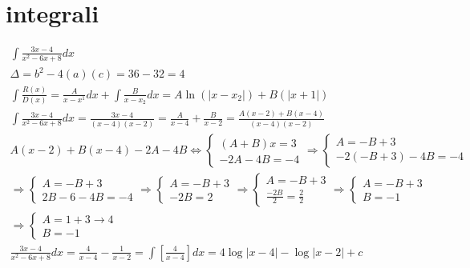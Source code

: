 \documentclass{article}
\newcommand{\abs}[1]{\lvert#1\rvert}
\begin{document}
\section{integrali}
\begin{equation*}
	\begin{matrix}
		\int\frac{3x-4}{x^2-6x+8}dx\\
		\Delta=b^2-4(a)(c)=36-32=4\\
		\int\frac{R(x)}{D(x)}=\frac{A}{x-x^1}dx+\int\frac{B}{x-x_2}dx=A\ln(\abs{x-x_2})+B(\abs{x+1})\\
		\int\frac{3x-4}{x^2-6x+8}dx=\frac{3x-4}{(x-4)(x-2)}=\frac{A}{x-4}+\frac{B}{x-2}=\frac{A(x-2)+B(x-4)}{(x-4)(x-2)}\\
		A(x-2)+B(x-4)-2A-4B\Leftrightarrow\begin{cases}
			(A+B)x=3 \\
			-2A-4B=-4
		\end{cases}\Rightarrow\begin{cases}
			A=-B+3\\
			-2(-B+3)-4B=-4
		\end{cases}\\\Rightarrow\begin{cases}
			A=-B+3\\
			2B-6-4B=-4
		\end{cases}\Rightarrow\begin{cases}
			A=-B+3\\
			-2B=2
		\end{cases}\Rightarrow\begin{cases}
			A=-B+3\\
			\frac{-2B}{2}=\frac{2}{2}
		\end{cases}\Rightarrow\begin{cases}
			A=-B+3\\
			B=-1
		\end{cases}\\
		\Rightarrow\begin{cases}
			A=1+3\to 4\\
			B=-1
		\end{cases}\\
		\frac{3x-4}{x^2-6x+8}dx=\frac{4}{x-4}-\frac{1}{x-2}=\int\left[\frac{4}{x-4}\right]dx=4\log\abs{x-4}-\log\abs{x-2}+c
	\end{matrix}
\end{equation*}
\end{document}

